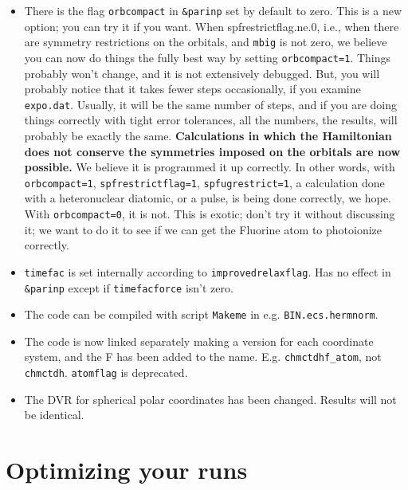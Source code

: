 \documentclass[10pt,leqno, oneside]{book}
\begin{document}
\begin{itemize}
%
\item{There is the flag \verb#orbcompact# in \verb#&parinp# set by default to zero.  This is a new option; you can try it if you want.
When spfrestrictflag.ne.0, i.e., when there are symmetry restrictions on the orbitals, and \verb#mbig# is not zero, we believe you can now do things
the fully best way by setting \verb#orbcompact=1#.  Things probably won't change, and it is not extensively debugged.  But, you will probably notice that it takes
fewer steps occasionally, if you examine \verb#expo.dat#.  Usually, it will be the same number of steps, and if you are doing things correctly with tight
error tolerances, all the numbers, the results, will probably be exactly the same.  \textbf{Calculations in which the Hamiltonian does not conserve the symmetries 
imposed on the orbitals are now possible.}  We believe it is programmed it up correctly.  In other words, with \verb#orbcompact=1#, \verb#spfrestrictflag=1#,
\verb#spfugrestrict=1#, a calculation done with a heteronuclear diatomic, or a pulse, is being done correctly, we hope.  
With \verb#orbcompact=0#, it is not.
This is exotic; don't try it without discussing it; we want to do it to see if we can get the Fluorine atom to photoionize correctly.}
%
\item{\verb#timefac# is set internally according to \verb#improvedrelaxflag#.  Has no effect in \verb#&parinp# except if \verb#timefacforce# isn't zero.}
\item{The code can be compiled with script \verb#Makeme# in e.g. \verb#BIN.ecs.hermnorm#.}
\item{The code is now linked separately making a version for each coordinate system, and the F has been added to the name.  
E.g. \verb#chmctdhf_atom#, not \verb#chmctdh#.  \verb#atomflag# is deprecated.}
\item{The DVR for spherical polar coordinates has been changed.  Results will not be identical.}
\end{itemize}



\section{Optimizing your runs}
\end{document}
